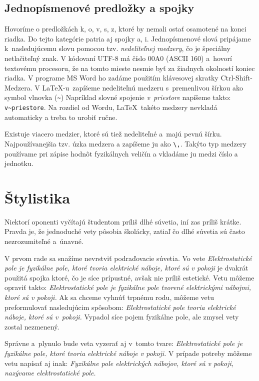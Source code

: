 \subsection{Jednopísmenové predložky a spojky}
Hovoríme o predložkách k, o, v, s, z,
ktoré by nemali ostať osamotené na konci riadka.
Do tejto kategórie patria aj spojky a, i.
Jednopísmenové slová pripájame k~nasledujúcemu slovu pomocou
tzv. \emph{nedeliteľnej medzery},
čo je špeciálny netlačiteľný znak.
V kódovaní UTF-8 má číslo 00A0 (ASCII 160)
a~hovorí textovému procesoru,
že na tomto mieste nesmie byť za žiadnych okolností
koniec riadka.
V programe MS Word ho zadáme použitím klávesovej skratky
Ctrl-Shift-Medzera.
V \LaTeX-u\ zapíšeme nedeliteľnú medzeru s~premenlivou šírkou
ako symbol vlnovka (\verb|~|)
Napríklad slovné spojenie \emph{v~priestore} napíšeme takto:
\verb|v~priestore|.
Na rozdiel od Wordu, \LaTeX\ takéto medzery nevkladá automaticky
a treba to urobiť ručne.

Existuje viacero medzier, ktoré sú tiež nedeliteľné a~majú pevnú šírku.
Najpoužívanejšia tzv. úzka medzera a zapíšeme ju ako \verb|\,|.
Takýto typ medzery používame pri zápise hodnôt fyzikálnych veličín a vkladáme ju medzi číslo a jednotku.

\section{Štylistika}
Niektorí oponenti vyčítajú študentom príliš dlhé súvetia,
iní zas príliš krátke.
Pravda je, že jednoduché vety pôsobia školácky,
zatiaľ čo dlhé súvetia sú často nezrozumiteľné a~únavné.

V prvom rade sa snažíme nevrstviť podraďovacie súvetia.
Vo vete \emph{Elektrostatické pole je fyzikálne pole,
ktoré tvoria elektrické náboje, ktoré sú v pokoji}
je dvakrát použitá spojka ktoré,
čo je síce prípustné, avšak nie príliš estetické.
Vetu môžeme opraviť takto:
\emph{Elektrostatické pole je fyzikálne
pole tvorené elektrickými nábojmi, ktoré sú v pokoji.}
Ak sa chceme vyhnúť trpnému rodu,
môžeme vetu preformulovať nasledujúcim spôsobom:
\emph{Elektrostatické pole tvoria elektrické náboje,
ktoré sú v~pokoji.}
Vypadol síce pojem fyzikálne pole,
ale zmysel vety zostal nezmenený.

Správne a~plynulo bude veta vyzerať aj v~tomto tvare:
\emph{Elektrostatické pole je fyzikálne pole,
ktoré tvoria elektrické náboje v pokoji.}
V prípade potreby môžeme vetu napísať aj inak:
\emph{Fyzikálne pole elektrických nábojov,
ktoré sú v pokoji, nazývame elektrostatické pole.}

